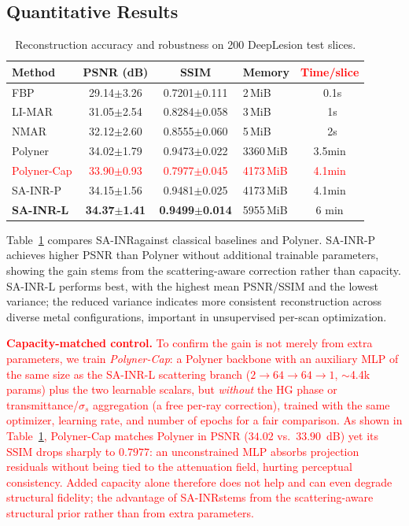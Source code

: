 \documentclass[journal]{IEEEtran}
\newcommand{\new}[1]{\textcolor{red}{#1}}  %
\def\ourmodel{SA-INR}
\begin{document}
\subsection{Quantitative Results}
\begin{table}[t!]
  \centering
  \caption{Reconstruction accuracy and robustness on 200 DeepLesion test slices.}
  \label{tab:results}
  \begin{tabular}{@{}lcclc@{}}
    \toprule
    Method & PSNR (dB) & SSIM  &Memory & \new{Time/slice}\\
    \midrule
    FBP     & 29.14$\pm$3.26 & 0.7201$\pm$0.111  &2\,MiB& ~0.1s\\
    LI-MAR  & 31.05$\pm$2.54 & 0.8284$\pm$0.058  &3\,MiB& ~1s\\
    NMAR    & 32.12$\pm$2.60 & 0.8555$\pm$0.060  &5\,MiB& ~2s\\
    \midrule
    Polyner & 34.02$\pm$1.79 & 0.9473$\pm$0.022  &3360\,MiB & 3.5min\\
    \new{Polyner-Cap}& \new{33.90$\pm$0.93}& \new{0.7977$\pm$0.045}&\new{4173\,MiB} & \new{4.1min}\\
 \ourmodel-P & 34.15$\pm$1.56 & 0.9481$\pm$0.025  & 4173\,MiB &4.1min\\
    \textbf{\ourmodel-L} & \textbf{34.37$\pm$1.41} & \textbf{0.9499$\pm$0.014}  &5955\,MiB & 6 min\\
    \bottomrule
  \end{tabular}
\end{table}

Table~\ref{tab:results} compares \ourmodel against classical baselines and Polyner. \ourmodel-P achieves higher PSNR than Polyner without additional trainable parameters, showing the gain stems from the scattering-aware correction rather than capacity. \ourmodel-L performs best, with the highest mean PSNR/SSIM and the lowest variance; the reduced variance indicates more consistent reconstruction across diverse metal configurations, important in unsupervised per-scan optimization. 


\new{\textbf{Capacity-matched control.} To confirm the gain is not merely from extra parameters, we train \emph{Polyner-Cap}: a Polyner backbone with an auxiliary MLP of the same size as the \ourmodel-L scattering branch ($2\!\rightarrow\!64\!\rightarrow\!64\!\rightarrow\!1$, $\sim$4.4k params) plus the two learnable scalars, but \emph{without} the HG phase or transmittance/$\sigma_s$ aggregation (a free per-ray correction), trained with the same optimizer, learning rate, and number of epochs for a fair comparison. As shown in Table~\ref{tab:results}, Polyner-Cap matches Polyner in PSNR ($34.02$ vs.\ $33.90$~dB) yet its SSIM drops sharply to $0.7977$: an unconstrained MLP absorbs projection residuals without being tied to the attenuation field, hurting perceptual consistency. Added capacity alone therefore does not help and can even degrade structural fidelity; the advantage of \ourmodel stems from the scattering-aware structural prior rather than from extra parameters.}
\end{document}
